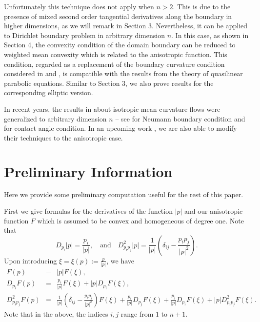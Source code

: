 \documentclass[12pt]{article}
\numberwithin{equation}{section}
\theoremstyle{plain}
\theoremstyle{definition}
\theoremstyle{remark}
\begin{document}
Unfortunately this technique does not apply when $n>2$. This is due to the presence of mixed second order tangential derivatives along the boundary in higher dimensions, as we will remark in Section 3. Nevertheless, it can be applied to Dirichlet boundary problem in arbitrary dimension $n$. In this case, as shown in Section 4, the convexity condition of the domain boundary can be reduced to weighted mean convexity which is related to the anisotropic function. 
This condition, regarded as a replacement of the boundary curvature condition considered in \cite[Section 9]{Se} and \cite[Section 14.3]{GT}, is compatible with the results from the theory of quasilinear parabolic equations. Similar to Section 3, 
we also prove results for the corresponding elliptic version.

In recent years, the results in \cite{AW2} about isotropic mean curvature flows were generalized to arbitrary dimension $n$ -- see \cite{MWW} for Neumann boundary condition and \cite{GMWW} for contact angle condition. In an upcoming work \cite{CY2}, we are also able to 
modify their techniques to the anisotropic case.


\section{Preliminary Information}\label{sec:prelim}
Here we provide some preliminary computation useful for the rest of this paper.

First we give formulas for the derivatives of the function $|p|$ and our anisotropic function $F$ which is assumed to be convex and homogeneous of degree one. Note that
\begin{equation}
D_{p_i} |p|=\frac{p_i}{|p|},\quad\text{and}\quad
D^2_{p_i p_j} |p|=\frac{1}{|p|}(\delta_{ij}-\frac{p_i p_j}{|p|^2}).
\end{equation}
Upon introducing $\xi=\xi(p) := \frac{p}{|p|}$, we have
\begin{eqnarray}
F(p)&=&|p|F(\xi),\\
D_{p_i} F(p)&=&\frac{p_i}{|p|} F(\xi) + |p| D_{p_i} F(\xi),\\
D^2_{p_i p_j} F(p)&=&\frac{1}{|p|}(\delta_{ij}-\frac{p_i p_j}{|p|^2}) F(\xi) + \frac{p_i}{|p|}  D_{p_j} F(\xi) + \frac{p_j}{|p|}  D_{p_i} F(\xi) + |p| D^2_{p_i p_j} F(\xi).
\end{eqnarray}
Note that in the above, the indices $i,j$ range from $1$ to $n+1$.
\end{document}
